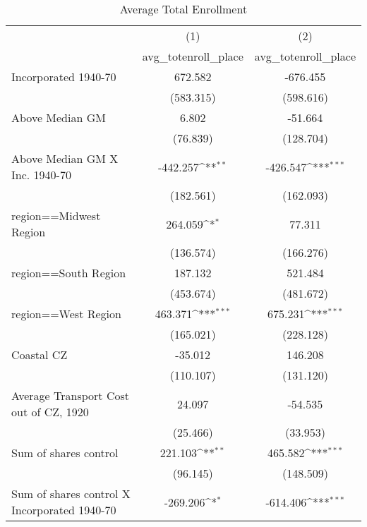 \begin{table}[htbp]\centering
\def\sym#1{\ifmmode^{#1}\else\(^{#1}\)\fi}
\caption{Average Total Enrollment}
\begin{tabular}{l*{2}{c}}
\hline\hline
                    &\multicolumn{1}{c}{(1)}&\multicolumn{1}{c}{(2)}\\
                    &\multicolumn{1}{c}{avg\_totenroll\_place}&\multicolumn{1}{c}{avg\_totenroll\_place}\\
\hline
Incorporated 1940-70&     672.582         &    -676.455         \\
                    &   (583.315)         &   (598.616)         \\
[1em]
Above Median GM     &       6.802         &     -51.664         \\
                    &    (76.839)         &   (128.704)         \\
[1em]
Above Median GM X Inc. 1940-70&    -442.257\sym{**} &    -426.547\sym{***}\\
                    &   (182.561)         &   (162.093)         \\
[1em]
region==Midwest Region&     264.059\sym{*}  &      77.311         \\
                    &   (136.574)         &   (166.276)         \\
[1em]
region==South Region&     187.132         &     521.484         \\
                    &   (453.674)         &   (481.672)         \\
[1em]
region==West Region &     463.371\sym{***}&     675.231\sym{***}\\
                    &   (165.021)         &   (228.128)         \\
[1em]
Coastal CZ          &     -35.012         &     146.208         \\
                    &   (110.107)         &   (131.120)         \\
[1em]
Average Transport Cost out of CZ, 1920&      24.097         &     -54.535         \\
                    &    (25.466)         &    (33.953)         \\
[1em]
Sum of shares control&     221.103\sym{**} &     465.582\sym{***}\\
                    &    (96.145)         &   (148.509)         \\
[1em]
Sum of shares control X Incorporated 1940-70&    -269.206\sym{*}  &    -614.406\sym{***}\\

\end{tabular}
\end{table}
